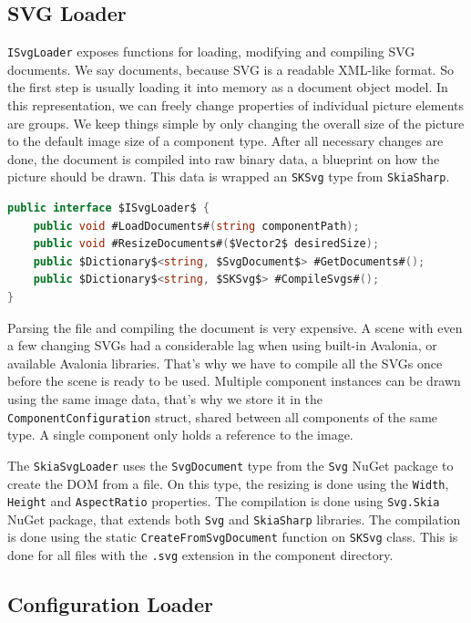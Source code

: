 \subsection{SVG Loader}

\texttt{ISvgLoader} exposes functions for loading, modifying and compiling SVG documents. We say documents, because SVG is a readable XML-like format. So the first step is usually loading it into memory as a document object model. In this representation, we can freely change properties of individual picture elements are groups. We keep things simple by only changing the overall size of the picture to the default image size of a component type. After all necessary changes are done, the document is compiled into raw binary data, a blueprint on how the picture should be drawn. This data is wrapped an \texttt{SKSvg} type from \texttt{SkiaSharp}.

\begin{lstlisting}[language=csharp, caption={\texttt{ISvgLoader} interface}]
public interface $ISvgLoader$ {
    public void #LoadDocuments#(string componentPath);
    public void #ResizeDocuments#($Vector2$ desiredSize);
    public $Dictionary$<string, $SvgDocument$> #GetDocuments#();
    public $Dictionary$<string, $SKSvg$> #CompileSvgs#();
}
\end{lstlisting}

Parsing the file and compiling the document is very expensive. A scene with even a few changing SVGs had a considerable lag when using built-in Avalonia, or available Avalonia libraries. That's why we have to compile all the SVGs once before the scene is ready to be used. Multiple component instances can be drawn using the same image data, that's why we store it in the \texttt{ComponentConfiguration} struct, shared between all components of the same type. A single component only holds a reference to the image.

The \texttt{SkiaSvgLoader} uses the \texttt{SvgDocument} type from the \texttt{Svg} NuGet package to create the DOM from a file. On this type, the resizing is done using the \texttt{Width}, \texttt{Height} and \texttt{AspectRatio} properties. The compilation is done using \texttt{Svg.Skia} NuGet package, that extends both \texttt{Svg} and \texttt{SkiaSharp} libraries. The compilation is done using the static \texttt{CreateFromSvgDocument} function on \texttt{SKSvg} class. This is done for all files with the \texttt{.svg} extension in the component directory.


\subsection{Configuration Loader}

